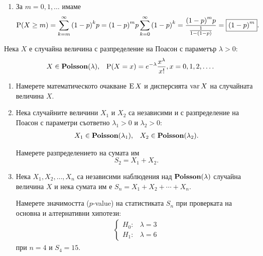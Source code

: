 \documentclass{../../common/topic}
\begin{document}
\begin{solution}
\begin{enumerate}[label=\alph*)]
    \item За \( m = 0, 1, \ldots \) имаме
    \begin{equation*}
      \operatorname{P}(X \geq m)
      =
      \sum_{k=m}^\infty {(1-p)}^k p
      =
      {(1-p)}^m p \sum_{k=0}^\infty {(1-p)}^k
      =
      \frac {{(1-p)}^m p} {\frac 1 {1-(1-p)}}
      =
      \boxed{{(1-p)}^m}.
    \end{equation*}
  \end{enumerate}
\end{solution}

\begin{problem}\label{ex:se_summer2016}
  Нека \( X \) е случайна величина с разпределение на Поасон с параметър \( \lambda > 0 \):
  \begin{align*}
    X \in \operatorname{\mathbf{Poisson}}(\lambda),
    &&
    \operatorname{P}(X = x) = e^{-\lambda} \frac {x^\lambda} {x!}, x = 0, 1, 2, \ldots.
  \end{align*}

  \begin{enumerate}[label=\alph*)]
    \item Намерете математическото очакване \( \operatorname{E} X \) и дисперсията \( \operatorname{var} X \) на случайната величина \( X \).
    \item Нека случайните величини \( X_1 \) и \( X_2 \) са независими и с разпределение на Поасон с параметри съответно \( \lambda_1 > 0 \) и \( \lambda_2 > 0 \):
    \begin{align*}
      X_1 \in \operatorname{\mathbf{Poisson}}(\lambda_1),
      &&
      X_2 \in \operatorname{\mathbf{Poisson}}(\lambda_2).
    \end{align*}

    Намерете разпределението на сумата им
    \begin{equation*}
      S_2 = X_1 + X_2.
    \end{equation*}

    \item Нека \( X_1, X_2, \ldots, X_n \) са независими наблюдения над \( \operatorname{\mathbf{Poisson}}(\lambda) \) случайна величина \( X \) и нека сумата им е \( S_n = X_1 + X_2 + \cdots + X_n \).

    Намерете значимостта (\( p \)-value) на статистиката \( S_n \) при проверката на основна и алтернативни хипотези:
    \begin{align*}
      \begin{cases}
        H_0: &\lambda = 3 \\
        H_1: &\lambda = 6
      \end{cases}
    \end{align*}
    при \( n = 4 \) и \( S_4 = 15 \).
  \end{enumerate}
\end{problem}
\end{document}
